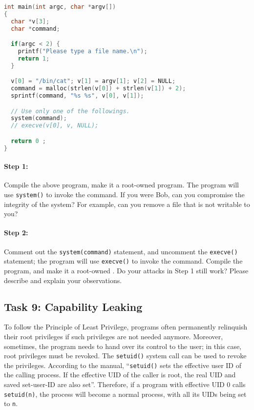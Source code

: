 \begin{lstlisting}[language=C, caption=\texttt{catall.c}]
int main(int argc, char *argv[])
{
  char *v[3];
  char *command;

  if(argc < 2) {
    printf("Please type a file name.\n");
    return 1;
  }

  v[0] = "/bin/cat"; v[1] = argv[1]; v[2] = NULL;
  command = malloc(strlen(v[0]) + strlen(v[1]) + 2);
  sprintf(command, "%s %s", v[0], v[1]);

  // Use only one of the followings.
  system(command);
  // execve(v[0], v, NULL);

  return 0 ;
}
\end{lstlisting}


\paragraph{Step 1:} Compile the above program, make it a root-owned
\setuid program. The program will use
{\tt system()} to invoke the command.
If you were Bob, can you compromise the integrity of the system? For example,
can you remove a file that is not writable to you?


\paragraph{Step 2:} Comment out the {\tt system(command)} statement, and
uncomment the {\tt execve()} statement; the program
will use {\tt execve()} to invoke the command. Compile the program, and
make it a root-owned \setuid.
Do your attacks in Step 1 still work? Please describe and explain your observations.



\subsection{Task 9: Capability Leaking}

To follow the Principle of Least Privilege, \setuid programs often
permanently relinquish their root privileges if such privileges are not
needed anymore. Moreover, sometimes, the program needs to hand over its
control to the user; in this case, root privileges must be revoked.
The {\tt setuid()} system call can be used to revoke the privileges.
According to the manual, ``\texttt{setuid()} sets the effective user ID of
the calling process. If the effective UID of the caller is root, the real
UID and saved set-user-ID are also set''. Therefore, if a \setuid program
with effective UID 0 calls \texttt{setuid(n)}, the process will become a
normal process, with all its UIDs being set to \texttt{n}.

